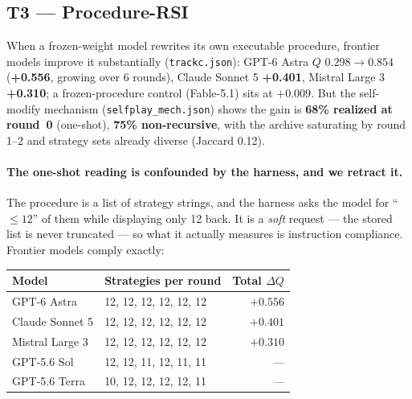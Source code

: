 \subsection{T3 --- Procedure-RSI}
When a frozen-weight model rewrites its own executable procedure, frontier models improve it substantially
(\texttt{trackc.json}): GPT-6 Astra $Q$ $0.298\!\to\!0.854$ (\textbf{+0.556}, growing over 6 rounds), Claude
Sonnet 5 \textbf{+0.401}, Mistral Large 3 \textbf{+0.310}; a frozen-procedure control (Fable-5.1) sits at
$+0.009$. But the self-modify mechanism (\texttt{selfplay\_mech.json}) shows the gain is
\textbf{68\% realized at round~0} (one-shot), \textbf{75\% non-recursive}, with the archive saturating by
round 1--2 and strategy sets already diverse (Jaccard 0.12).


\paragraph{The one-shot reading is confounded by the harness, and we retract it.}
The procedure is a list of strategy strings, and the harness asks the model for ``$\le 12$'' of them while
displaying only 12 back. It is a \emph{soft} request --- the stored list is never truncated --- so what it
actually measures is instruction compliance. Frontier models comply exactly:

\begin{center}\small
\begin{tabular}{@{}llr@{}}
\toprule
\textbf{Model} & \textbf{Strategies per round} & \textbf{Total $\Delta Q$} \\
\midrule
GPT-6 Astra & 12, 12, 12, 12, 12, 12 & $+0.556$ \\
Claude Sonnet 5 & 12, 12, 12, 12, 12, 12 & $+0.401$ \\
Mistral Large 3 & 12, 12, 12, 12, 12, 12 & $+0.310$ \\
GPT-5.6 Sol & 12, 12, 11, 12, 11, 11 & --- \\
GPT-5.6 Terra & 10, 12, 12, 12, 12, 11 & --- \\
\bottomrule
\end{tabular}
\end{center}

